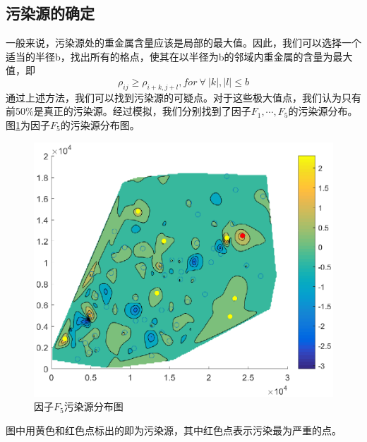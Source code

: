 \documentclass[a4paper]{article}
\begin{document}
\subsection{污染源的确定}
一般来说，污染源处的重金属含量应该是局部的最大值。因此，我们可以选择一个适当的半径b，找出所有的格点，使其在以半径为b的邻域内重金属的含量为最大值，即
\begin{equation}
\rho_{ij} \geq \rho_{i+k, j+l}, for\ \forall \ |k|, |l| \le b
\end{equation}
通过上述方法，我们可以找到污染源的可疑点。对于这些极大值点，我们认为只有前50\%是真正的污染源。经过模拟，我们分别找到了因子$F_1,\cdots,F_5$的污染源分布。
图\ref{fig:polluted-source}为因子$F_5$的污染源分布图。
\begin{figure}
    \centering 
    \includegraphics[scale=0.9]{pictures/polluted-source.eps}
    \caption{因子$F_5$污染源分布图}
    \label{fig:polluted-source}
\end{figure}
图中用黄色和红色点标出的即为污染源，其中红色点表示污染最为严重的点。
\end{document}
